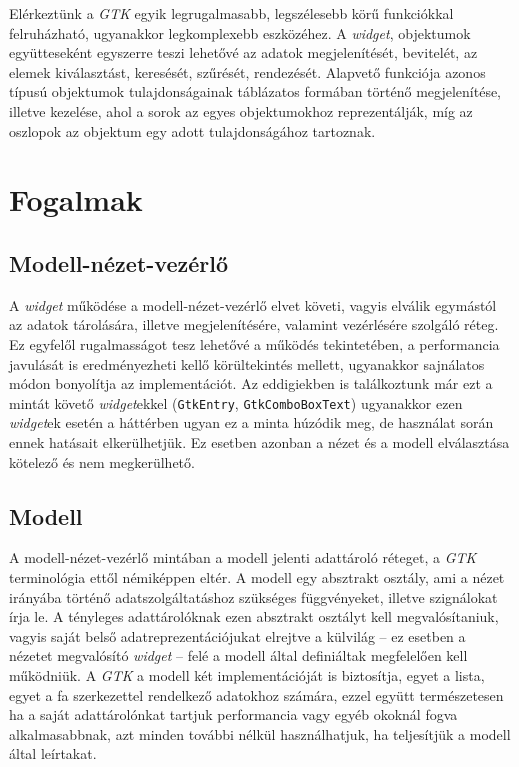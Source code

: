 Elérkeztünk a \textit{GTK} egyik legrugalmasabb, legszélesebb körű funkciókkal felruházható, ugyanakkor  legkomplexebb eszközéhez. A \textit{widget}, objektumok együtteseként egyszerre teszi lehetővé az adatok megjelenítését, bevitelét, az elemek kiválasztást, keresését, szűrését, rendezését. Alapvető funkciója azonos típusú objektumok tulajdonságainak táblázatos formában történő megjelenítése, illetve kezelése, ahol a sorok az egyes objektumokhoz reprezentálják, míg az oszlopok az objektum egy adott tulajdonságához tartoznak.

\section{Fogalmak}

\subsection{Modell-nézet-vezérlő}

A \textit{widget} működése a modell-nézet-vezérlő elvet követi, vagyis elválik egymástól az adatok tárolására, illetve megjelenítésére, valamint vezérlésére szolgáló réteg. Ez egyfelől rugalmasságot tesz lehetővé a működés tekintetében, a performancia javulását is eredményezheti kellő körültekintés mellett, ugyanakkor sajnálatos módon bonyolítja az implementációt. Az eddigiekben is találkoztunk már ezt a mintát követő \textit{widget}ekkel (\texttt{GtkEntry}, \texttt{GtkComboBoxText}) ugyanakkor ezen \textit{widget}ek esetén a háttérben ugyan ez a minta húzódik meg, de használat során ennek hatásait elkerülhetjük. Ez esetben azonban a nézet és a modell elválasztása kötelező és nem megkerülhető.

\subsection{Modell}

A modell-nézet-vezérlő mintában a modell jelenti adattároló réteget, a \textit{GTK} terminológia ettől némiképpen eltér. A modell egy absztrakt osztály, ami a nézet irányába történő adatszolgáltatáshoz szükséges függvényeket, illetve szignálokat írja le. A tényleges adattárolóknak ezen absztrakt osztályt kell megvalósítaniuk, vagyis saját belső adatreprezentációjukat elrejtve a külvilág -- ez esetben a nézetet megvalósító \textit{widget} -- felé a modell által definiáltak megfelelően kell működniük. A \textit{GTK} a modell két implementációját is biztosítja, egyet a lista, egyet a fa szerkezettel rendelkező adatokhoz számára, ezzel együtt természetesen ha a saját adattárolónkat tartjuk performancia vagy egyéb okoknál fogva alkalmasabbnak, azt minden további nélkül használhatjuk, ha teljesítjük a modell által leírtakat.


